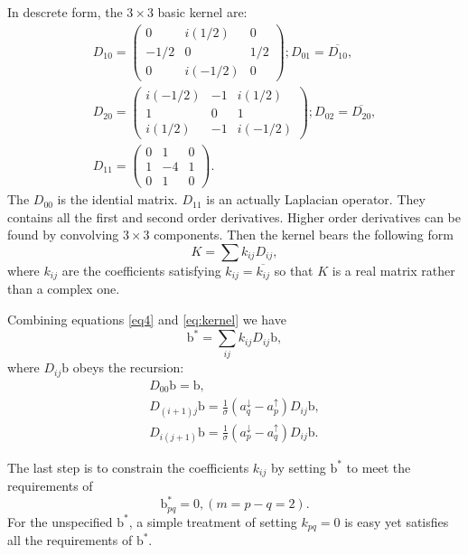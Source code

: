 \documentclass[apj]{emulateapj}
\begin{document}
In descrete form, the $3\times 3$ basic kernel are:
\begin{align}
D_{10}=\begin{pmatrix}0 & i(1/2) &
0\\ -1/2 & 0 & 1/2\\0 & i(-1/2) & 0\end{pmatrix}; D_{01}=\overline{D_{10}},\\
D_{20}=\begin{pmatrix}i(-1/2) & -1 &
i(1/2)\\ 1 & 0 & 1\\i(1/2) & -1 & i(-1/2)\end{pmatrix}; D_{02}=\overline{D_{20}},\\
D_{11}=\begin{pmatrix}0 & 1 &
0\\ 1 & -4 & 1\\0 & 1 & 0\end{pmatrix}.
\end{align}
The $D_{00}$ is the idential matrix. $D_{11}$ is an actually Laplacian operator. 
They contains all the first and second order derivatives.
Higher order derivatives can be found by convolving $3\times 3$
components. Then the kernel bears the following form
\begin{equation}
K=\sum k_{ij}D_{ij},
\label{eq:kernel}
\end{equation}
where $k_{ij}$ are the coefficients satisfying
$k_{ij}=\overline{k_{ij}}$ so that $K$ is a real matrix rather than
a complex one.


Combining equations \ref{eq4} and \ref{eq:kernel} we have
\begin{equation}
\mathrm{b}^{*}=\sum_{ij}k_{ij}D_{ij}\mathrm{b},
\end{equation}
where $D_{ij}\mathrm{b}$ obeys the recursion:
\begin{gather}
\label{eq:recursive}
D_{00}\mathrm{b}=\mathrm{b},\\
D_{(i+1)j}\mathrm{b}=\frac{1}{\sigma}(a_{q}^{\downarrow}-a_{p}^{\uparrow})D_{ij}\mathrm{b},\\
D_{i(j+1)}\mathrm{b}=\frac{1}{\sigma}(a_{p}^{\downarrow}-a_{q}^{\uparrow})D_{ij}\mathrm{b}.
\end{gather}


The last step is to constrain the coefficients $k_{ij}$ by setting
$\mathrm{b}^{*}$ to meet the requirements of
\begin{equation}
\mathrm{b}_{pq}^{*}=0, (m=p-q=2).
\end{equation}
For the unspecified $\mathrm{b}^{*}$, a simple treatment of setting
$k_{pq}=0$ is easy yet satisfies all the requirements of
$\mathrm{b}^*$.
\end{document}
